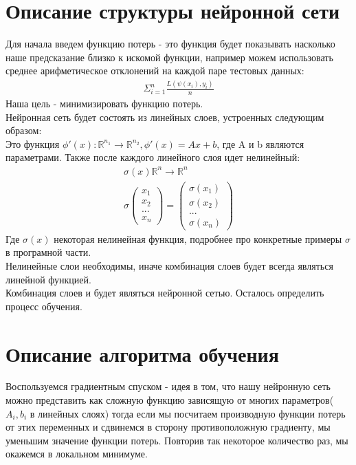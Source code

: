 \documentclass{article}
\newcommand{\R}{\mathbb{R}}
\begin{document}
\section{Описание структуры нейронной сети}
Для начала введем функцию потерь - это функция будет 
показывать насколько наше предсказание близко к искомой функции,
например можем использовать среднее арифметическое отклонений на каждой 
паре тестовых данных:
\begin{align*}
    \Sigma_{i=1}^{n}\frac{L(\psi(x_i), y_i)}{n}
\end{align*}
Наша цель - минимизировать функцию потерь.\\
Нейронная сеть будет состоять из линейных слоев, устроенных следующим образом:\\
Это функция $\phi'(x) : \R^{n_1} \to \R^{n_2}, \phi'(x) = Ax + b$, где A и b
являются параметрами. Также после каждого линейного слоя идет нелинейный:\\
\begin{align*}
    \sigma(x) \R^{n} \to \R^{n}\\
    \sigma\begin{pmatrix}
        x_1\\
        x_2\\
        ...\\
        x_n
    \end{pmatrix}
    =\begin{pmatrix}
        \sigma(x_1)\\
        \sigma(x_2)\\
        ...\\
        \sigma(x_n)
    \end{pmatrix}
\end{align*}
Где $\sigma(x)$ некоторая нелинейная функция, подробнее про конкретные примеры 
$\sigma$ в програмной части.\\
Нелинейные слои необходимы, иначе комбинация слоев будет всегда являться линейной функцией.\\
Комбинация слоев и будет являться нейронной сетью. Осталось определить процесс обучения.\\
\section{Описание алгоритма обучения}
Воспользуемся градиентным спуском - идея в том, что нашу нейронную сеть 
можно представить как сложную функцию зависящую от многих параметров($A_i, b_i$ в линейных слоях)
тогда если мы посчитаем производную функции потерь от этих переменных и сдвинемся в сторону противоположную 
градиенту, мы уменьшим значение функции потерь. Повторив так некоторое количество раз, мы окажемся в
локальном минимуме.
\end{document}
